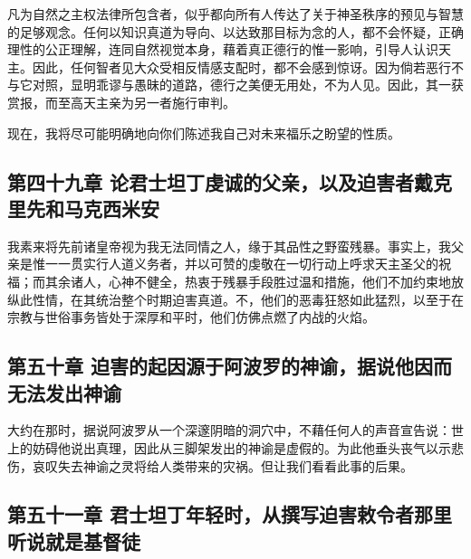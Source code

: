 \par

凡为自然之主权法律所包含者，似乎都向所有人传达了关于神圣秩序的预见与智慧的足够观念。任何以知识真道为导向、以达致那目标为念的人，都不会怀疑，正确理性的公正理解，连同自然视觉本身，藉着真正德行的惟一影响，引导人认识天主。因此，任何智者见大众受相反情感支配时，都不会感到惊讶。因为倘若恶行不与它对照，显明乖谬与愚昧的道路，德行之美便无用处，不为人见。因此，其一获赏报，而至高天主亲为另一者施行审判。\par

现在，我将尽可能明确地向你们陈述我自己对未来福乐之盼望的性质。\par


\subsection{第四十九章 论君士坦丁虔诚的父亲，以及迫害者戴克里先和马克西米安}

我素来将先前诸皇帝视为我无法同情之人，缘于其品性之野蛮残暴。事实上，我父亲是惟一一贯实行人道义务者，并以可赞的虔敬在一切行动上呼求天主圣父的祝福；而其余诸人，心神不健全，热衷于残暴手段胜过温和措施，他们不加约束地放纵此性情，在其统治整个时期迫害真道。不，他们的恶毒狂怒如此猛烈，以至于在宗教与世俗事务皆处于深厚和平时，他们仿佛点燃了内战的火焰。\par


\subsection{第五十章 迫害的起因源于阿波罗的神谕，据说他因而无法发出神谕}

大约在那时，据说阿波罗从一个深邃阴暗的洞穴中，不藉任何人的声音宣告说：世上的妨碍他说出真理，因此从三脚架发出的神谕是虚假的。为此他垂头丧气以示悲伤，哀叹失去神谕之灵将给人类带来的灾祸。但让我们看看此事的后果。\par


\subsection{第五十一章 君士坦丁年轻时，从撰写迫害敕令者那里听说就是基督徒}

